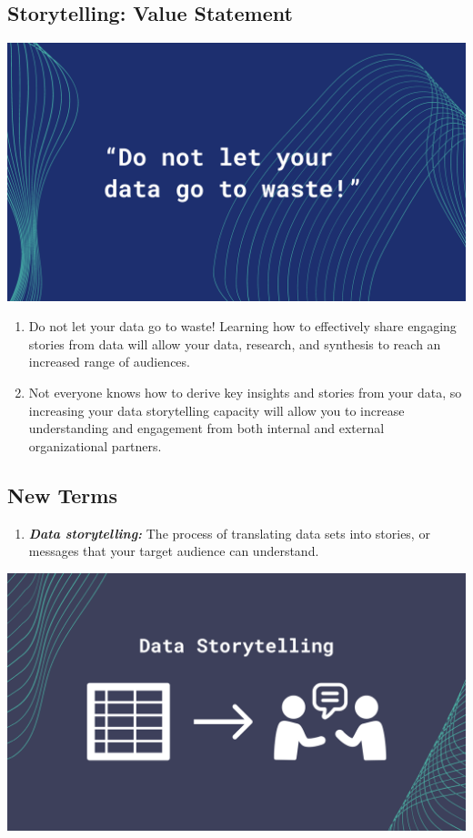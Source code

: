 \documentclass[
]{book}
\providecommand{\tightlist}{%
  \setlength{\itemsep}{0pt}\setlength{\parskip}{0pt}}
\begin{document}
\hypertarget{storytelling-value-statement}{%
\subsection{Storytelling: Value Statement}\label{storytelling-value-statement}}

\includegraphics{images/Data-Storytelling-Quote-2.png}

\begin{enumerate}
\def\labelenumi{\arabic{enumi}.}
\tightlist
\item
  Do not let your data go to waste! Learning how to effectively share engaging stories from data will allow your data, research, and synthesis to reach an increased range of audiences.
\item
  Not everyone knows how to derive key insights and stories from your data, so increasing your data storytelling capacity will allow you to increase understanding and engagement from both internal and external organizational partners.
\end{enumerate}

\hypertarget{new-terms}{%
\subsection{New Terms}\label{new-terms}}

\begin{enumerate}
\def\labelenumi{\arabic{enumi}.}
\tightlist
\item
  \textbf{\emph{Data storytelling:}} The process of translating data sets into stories, or messages that your target audience can understand.
\end{enumerate}

\includegraphics{images/Data-Storytelling-Graphic-3.png}
\end{document}
